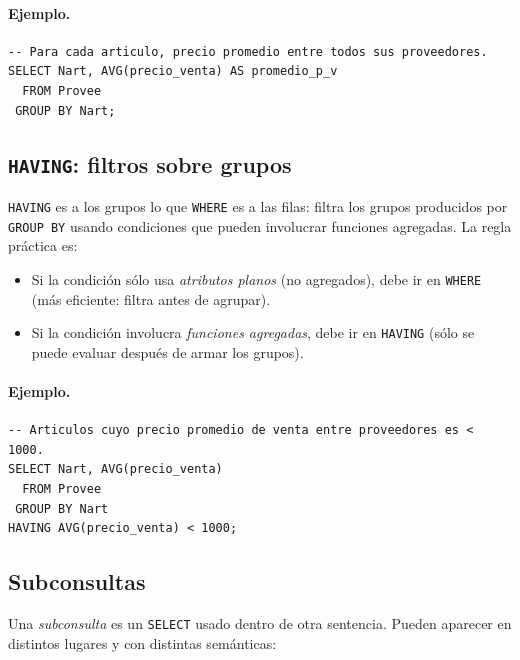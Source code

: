 \documentclass[11pt,a4paper]{article}
\begin{document}
\paragraph{Ejemplo.}

\begin{lstlisting}
-- Para cada articulo, precio promedio entre todos sus proveedores.
SELECT Nart, AVG(precio_venta) AS promedio_p_v
  FROM Provee
 GROUP BY Nart;
\end{lstlisting}

\subsection{\texttt{HAVING}: filtros sobre grupos}

\texttt{HAVING} es a los grupos lo que \texttt{WHERE} es a las filas: filtra
los grupos producidos por \texttt{GROUP BY} usando condiciones que pueden
involucrar funciones agregadas. La regla práctica es:

\begin{itemize}
    \item Si la condición sólo usa \emph{atributos planos} (no agregados),
    debe ir en \texttt{WHERE} (más eficiente: filtra antes de agrupar).
    \item Si la condición involucra \emph{funciones agregadas}, debe ir
    en \texttt{HAVING} (sólo se puede evaluar después de armar los grupos).
\end{itemize}

\paragraph{Ejemplo.}

\begin{lstlisting}
-- Articulos cuyo precio promedio de venta entre proveedores es < 1000.
SELECT Nart, AVG(precio_venta)
  FROM Provee
 GROUP BY Nart
HAVING AVG(precio_venta) < 1000;
\end{lstlisting}

\subsection{Subconsultas}

Una \emph{subconsulta} es un \texttt{SELECT} usado dentro de otra sentencia.
Pueden aparecer en distintos lugares y con distintas semánticas:
\end{document}
